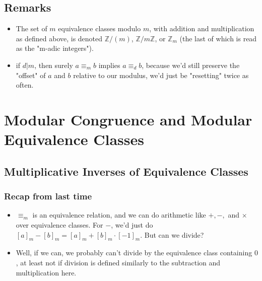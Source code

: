 \documentclass[10pt]{article}
\newcommand\ZZ{{\mathbb Z}}
\theoremstyle{definition}
\begin{document}
\subsection{Remarks}
\begin{itemize}
\item The set of $m$ equivalence classes modulo $m$, with addition and multiplication as defined above, is denoted $\ZZ/(m)$, $\ZZ/m\ZZ$, or $\ZZ_m$ (the last of which is read as the "m-adic integers").  
\item if $d|m$, then surely $a\equiv_m b$ implies $a\equiv_d b$, because we'd still preserve the "offset" of $a$ and $b$ relative to our modulus, we'd just be "resetting" twice as often.  
\end{itemize}
\section{Modular Congruence and Modular Equivalence Classes}
\subsection{Multiplicative Inverses of Equivalence Classes}
\subsubsection{Recap from last time} 
\begin{itemize}
\item $\equiv_m$ is an equivalence relation, and we can do arithmetic like $+,-,$ and $\times$ over equivalence classes.  For $-$, we'd just do $[a]_m - [b]_m = [a]_m + [b]_m\cdot [-1]_m$.  But can we divide?  
\item Well, if we can, we probably can't divide by the equivalence class containing $0$, at least not if division is defined similarly to the subtraction and multiplication here.  
\end{itemize}
\end{document}
